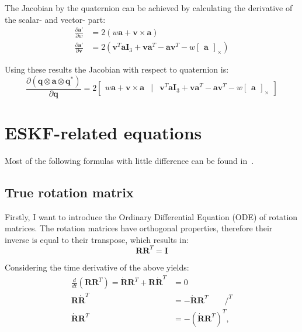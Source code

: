 The Jacobian by the quaternion can be achieved by calculating the derivative of the scalar- and vector- part:
\begin{equation}
\begin{aligned}
    \frac{\partial\mathbf{a}'}{\partial w}&=2(w\mathbf{a}+\mathbf{v}\times\mathbf{a}) \\
    \frac{\partial\mathbf{a}'}{\partial \mathbf{v}}&=2(\mathbf{v}^T\mathbf{a}\mathbf{I}_3+\mathbf{v}\mathbf{a}^T-\mathbf{a}\mathbf{v}^T-w\begin{bmatrix}
        \mathbf{a}
    \end{bmatrix}_\times)
\end{aligned}
\end{equation}

Using these results the Jacobian with respect to quaternion is:
\begin{equation}
    \frac{\partial(\mathbf{q}\otimes\mathbf{a}\otimes\mathbf{q}^*)}{\partial\mathbf{q}}=2\begin{bmatrix}
        w\mathbf{a}+\mathbf{v}\times\mathbf{a} & | & \mathbf{v}^T\mathbf{a}\mathbf{I}_3+\mathbf{v}\mathbf{a}^T-\mathbf{a}\mathbf{v}^T-w\begin{bmatrix} \mathbf{a} \end{bmatrix}_\times
    \end{bmatrix}
\end{equation}

\chapter{ESKF-related equations}\label{app:error-state-derivation}

Most of the following formulas with little difference can be found in~\cite{quaternion-eskf}.

\section{True rotation matrix}\label{app:der-true-rot}

Firstly, I want to introduce the Ordinary Differential Equation (ODE) of rotation matrices. The rotation matrices have orthogonal properties, therefore their inverse is equal to their transpose, which results in:
\begin{equation}
    \mathbf{R}\mathbf{R}^T=\mathbf{I}
\end{equation}

Considering the time derivative of the above yields:
\begin{equation}
\begin{aligned}
    \frac{d}{dt}(\mathbf{R}\mathbf{R}^T)=\dot{\mathbf{R}}\mathbf{R}^T+\mathbf{R}\dot{\mathbf{R}}^T&=0 \\
    \mathbf{R}\dot{\mathbf{R}}^T&=-\dot{\mathbf{R}}\mathbf{R}^T \qquad /^T \\
    \dot{\mathbf{R}}\mathbf{R}^T&=-{(\dot{\mathbf{R}}\mathbf{R}^T)}^T,
\end{aligned}
\end{equation}

